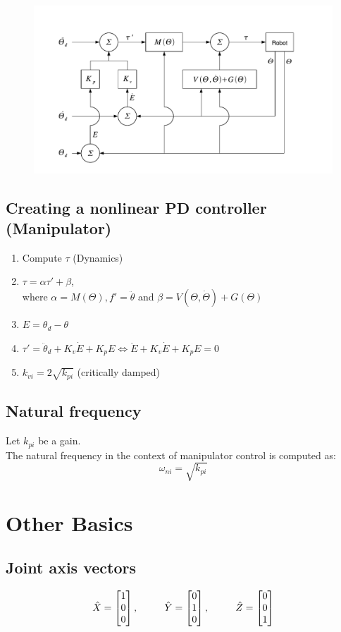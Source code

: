\documentclass[10pt,a4paper]{article}
\newcommand{\tab}[1][1]{\hspace*{#1cm}}
\newcommand{\vect}[1]{\ensuremath{\begin{bmatrix}#1\end{bmatrix}}}
\begin{document}
\begin{figure}[H]
	\includegraphics[width=0.5\columnwidth]{imgs/control_model-based_nonlinear.pdf}
\end{figure}

\subsection{Creating a nonlinear PD controller (Manipulator)}
\begin{enumerate}
	\item Compute $\tau$ (Dynamics)
	\item $\tau = \alpha \tau' + \beta$, \\
	where $\alpha = M(\Theta), f' = \ddot \theta$ and $\beta = V(\Theta, \dot \Theta) + G(\Theta)$
	\item $E = \theta_d - \theta$
	\item $\tau' = \ddot \theta_d + K_v \dot E + K_p E \iff \ddot E + K_v \dot E + K_p E = 0$
	\item $k_{vi} = 2 \sqrt{k_{pi}}$ (critically damped)
\end{enumerate}

\subsection{Natural frequency}
Let $k_{pi}$ be a gain.\\
The natural frequency in the context of manipulator control is computed as:
$$
	\omega_{ni} = \sqrt{k_{pi}}
$$

\section{Other Basics}

\subsection{Joint axis vectors}
$$
\hat{X} = \vect{1 \\ 0 \\ 0}
\text{,\tab}
\hat{Y} = \vect{0 \\ 1 \\ 0}
\text{,\tab}
\hat{Z} = \vect{0 \\ 0 \\ 1}
$$
\end{document}
